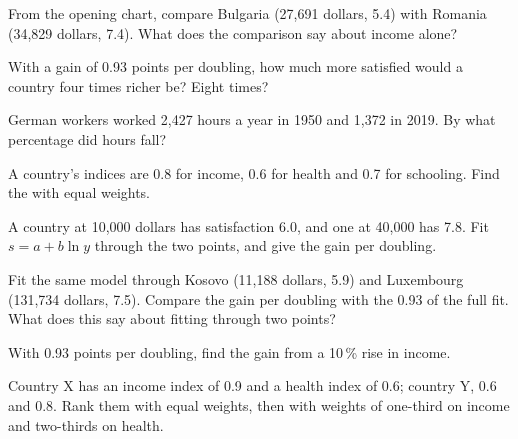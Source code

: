 \begin{exercise}[$\star$]\label{exo:g12:income-and-wellbeing:2}
From the opening chart, compare Bulgaria (27,691 dollars, 5.4) with Romania (34,829 dollars, 7.4). What does the comparison say about income alone?
\end{exercise}

\begin{exercise}[$\star$]\label{exo:g12:income-and-wellbeing:3}
With a gain of 0.93 points per doubling, how much more satisfied would a country four times richer be? Eight times?
\end{exercise}

\begin{exercise}[$\star$]\label{exo:g12:income-and-wellbeing:4}
German workers worked 2,427 hours a year in 1950 and 1,372 in 2019. By what percentage did hours fall?
\end{exercise}

\begin{exercise}[$\star$]\label{exo:g12:income-and-wellbeing:5}
A country's indices are 0.8 for income, 0.6 for health and 0.7 for schooling. Find the  with equal weights.
\end{exercise}

\begin{exercise}[$\star\star$]\label{exo:g12:income-and-wellbeing:6}
A country at 10,000 dollars has satisfaction 6.0, and one at 40,000 has 7.8. Fit $s = a + b \ln y$ through the two points, and give the gain per doubling.
\end{exercise}

\begin{exercise}[$\star\star$]\label{exo:g12:income-and-wellbeing:7}
Fit the same model through Kosovo (11,188 dollars, 5.9) and Luxembourg (131,734 dollars, 7.5). Compare the gain per doubling with the 0.93 of the full fit. What does this say
about fitting through two points?
\end{exercise}

\begin{exercise}[$\star\star$]\label{exo:g12:income-and-wellbeing:8}
With 0.93 points per doubling, find the gain from a 10\,\% rise in income.
\end{exercise}

\begin{exercise}[$\star\star$]\label{exo:g12:income-and-wellbeing:9}
Country X has an income index of 0.9 and a health index of 0.6; country Y, 0.6 and 0.8. Rank them with equal weights, then with weights of one-third on income and two-thirds
on health.
\end{exercise}

